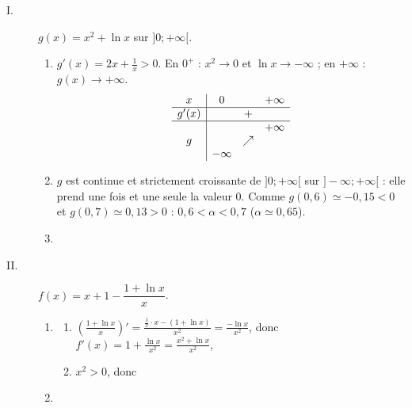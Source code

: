 \begin{description}
   \item[I.] $g(x) = x^2 + \ln x$ sur $]0 ; +\infty[$.
      \begin{enumerate}
         \item {}
            $g'(x) = 2x + \frac{1}{x} > 0$. En $0^+$ : $x^2 \to 0$ et $\ln x \to -\infty$ ; en $+\infty$ : $g(x) \to +\infty$.
            \[
               \begin{array}{c|ccc}
                  x & 0 & & +\infty \\ \hline
                  g'(x) & & + & \\ \hline
                  & & & +\infty \\
                  g & & \nearrow & \\
                  & -\infty & &
               \end{array}
            \]
         \item {}
            $g$ est continue et strictement croissante de $]0 ; +\infty[$ sur $]-\infty ; +\infty[$ : elle prend une fois et une seule
            la valeur $0$. 
            Comme $g(0{,}6) \simeq -0{,}15 < 0$ et $g(0{,}7) \simeq 0{,}13 > 0$ : $0{,}6 < \alpha < 0{,}7$ ($\alpha \simeq 0{,}65$).
         \item {}
            \par\noindent\ansbox{$g(x) < 0$ sur $]0 ; \alpha[$, $g(\alpha) = 0$, $g(x) > 0$ sur $]\alpha ; +\infty[$.}
      \end{enumerate}
   \item[II.] $f(x) = x + 1 - \dfrac{1 + \ln x}{x}$.
      \begin{enumerate}
         \item
            \begin{enumerate}
               \item {}
                  $\left(\frac{1 + \ln x}{x}\right)' = \frac{\frac{1}{x}\cdot x - (1 + \ln x)}{x^2} = \frac{-\ln x}{x^2}$, donc
                  $f'(x) = 1 + \frac{\ln x}{x^2} = \frac{x^2 + \ln x}{x^2}$, 
               \item {} $x^2 > 0$, donc 
            \end{enumerate}
         \item
            \begin{enumerate}

\end{enumerate}
\end{enumerate}
\end{description}
